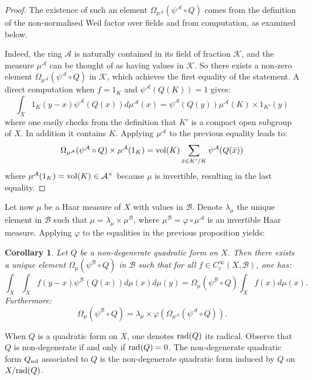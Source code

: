 \documentclass[11pt]{article}
\theoremstyle{plain}
\newtheorem{cor}[theo]{Corollary}
\theoremstyle{definition}
\theoremstyle{plain}
\theoremstyle{definition}
\theoremstyle{plain}
\begin{document}
\begin{proof} The existence of such an element $\Omega_{\mu^\mathcal{A}}(\psi^\mathcal{A} \circ Q)$ comes from the definition of the non-normalised Weil factor over fields and from computation, as examined below. 

Indeed, the ring $\mathcal{A}$ is naturally contained in its field of fraction $\mathcal{K}$, and the measure $\mu^\mathcal{A}$ can be thought of as having values in $\mathcal{K}$. So there exists \cite[Prop. 1.2]{trias_theta1} a non-zero element $\Omega_{\mu^\mathcal{A}}(\psi^\mathcal{A} \circ Q)$ in $\mathcal{K}$, which achieves the first equality of the statement. A direct computation when $f=1_K$ and $\psi^\mathcal{A}(Q(K))=1$ gives:
$$\int_X 1_K(y-x) \psi^\mathcal{A}( Q(x)) d\mu^\mathcal{A} (x) = \psi^\mathcal{A}(Q(y)) \mu^\mathcal{A}(K) \times 1_{K'}(y)$$
where one easily checks from the definition that $K'$ is a compact open subgroup of $X$. In addition it contains $K$. Applying $\mu^\mathcal{A}$ to the previous equality leads to:
$$\Omega_{\mu^\mathcal{A}}(\psi^\mathcal{A} \circ Q)  \times \mu^\mathcal{A}(1_K)= \textup{vol}(K) \sum_{\bar{x} \in K' / K} \psi^\mathcal{A}(Q(\bar{x}))$$
where $\mu^\mathcal{A}(1_K) = \textup{vol}(K) \in \mathcal{A}^\times$ because $\mu$ is invertible, resulting in the last equality. \end{proof}

Let now $\mu$ be a Haar measure of $X$ with values in $\mathcal{B}$. Denote $\lambda_\mu$ the unique element in $\mathcal{B}$ such that $\mu = \lambda_\mu \times \mu^\mathcal{B}$, where $\mu^\mathcal{B} = \varphi \circ \mu^\mathcal{A}$ is an invertible Haar measure. Applying $\varphi$ to the equalities in the previous proposition yields:

\begin{cor} \label{weil_factor_over_B_def_cor} Let $Q$ be a non-degenerate quadratic form on $X$. Then there exists a unique element $\Omega_\mu(\psi^\mathcal{B} \circ Q)$ in $\mathcal{B}$ such that for all $f \in C_c^\infty(X,\mathcal{B})$, one has:
$$\int_X \int_X f(y-x) \psi^\mathcal{B}( Q(x)) d\mu(x) d\mu (y) = \Omega_{\mu}(\psi^\mathcal{B} \circ Q) \int_X f(x) d \mu (x).$$
Furthermore:
$$\Omega_{\mu}(\psi^\mathcal{B} \circ Q)= \lambda_\mu \times \varphi\left( \Omega_{\mu^\mathcal{A}}(\psi^\mathcal{A} \circ Q) \right).$$ \end{cor}

When $Q$ is a quadratic form on $X$, one denotes $\textup{rad}(Q)$ its radical. Observe that $Q$ is non-degenerate if and only if $\textup{rad}(Q) = 0$. The non-degenerate quadratic form $Q_{\textup{nd}}$ associated to $Q$ is the non-degenerate quadratic form induced by $Q$ on $X / \textup{rad}(Q)$.
\end{document}
